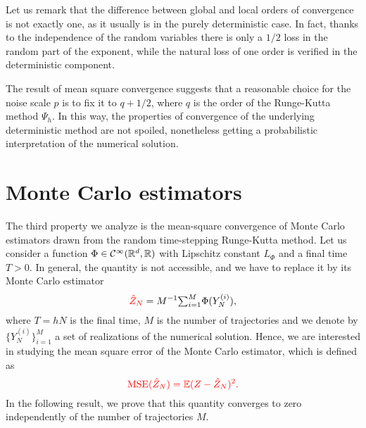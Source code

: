 \documentclass[final,onefignum,onetabnum]{siamonline171218}
\begin{document}
\begin{remark} Let us remark that the difference between global and local orders of convergence is not exactly one, as it usually is in the purely deterministic case. In fact, thanks to the independence of the random variables there is only a $1/2$ loss in the random part of the exponent, while the natural loss of one order is verified in the deterministic component.
\end{remark}
\begin{remark} The result of mean square convergence suggests that a reasonable choice for the noise scale $p$ is to fix it to  $q + 1/2$, where $q$ is the order of the Runge-Kutta method $\Psi_h$. In this way, the properties of convergence of the underlying deterministic method are not spoiled, nonetheless getting a probabilistic interpretation of the numerical solution.
\end{remark}


\section{Monte Carlo estimators}\label{sec:MonteCarlo}

The third property we analyze is the mean-square convergence of Monte Carlo estimators drawn from the random time-stepping Runge-Kutta method. Let us consider a function $\Phi\in\mathcal{C}^\infty(\mathbb{R}^d, \mathbb{R})$ with Lipschitz constant $L_\Phi$ and a final time $T > 0$.  In general, the quantity  is not accessible, and we have to replace it by its Monte Carlo estimator 
\begin{equation}\label{eq:MSE}
	\corr{\hat Z_N} = M^{-1} \sksum_{i = 1}^M \Phi(Y_N^{(i)}),
\end{equation}
where $T = hN$ is the final time, $M$ is the number of trajectories and we denote by $\{Y_N^{(i)}\}_{i=1}^M$ a set of realizations of the numerical solution. Hence, we are interested in studying the mean square error of the Monte Carlo estimator, which is defined as
\begin{equation}
	{\color{red}\operatorname{MSE}(\hat Z_N) = \operatorname{\mathbb{E}}(Z - \hat Z_N)^2.}
\end{equation}
In the following result, we prove that this quantity converges to zero independently of the number of trajectories $M$.
\end{document}
